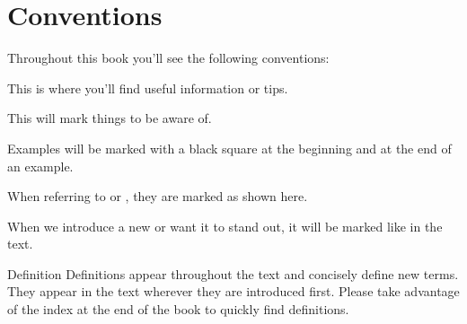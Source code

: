 % 

\section{Conventions}

Throughout this book you'll see the following conventions:

\begin{info}
This is where you'll find useful information or tips.
\end{info}

\begin{warning}
This will mark things to be aware of.
\end{warning}

\begin{example}
Examples will be marked with a black square at the beginning and at the end of an example.
\end{example}

When referring to  or , they are marked as shown here.

When we introduce a new  or want it to stand out, it will be marked like  in the text.  

\begin{definition}{Definition}
Definitions appear throughout the text and concisely define new terms.  They appear in the text wherever they are introduced first.  Please take advantage of the index at the end of the book to quickly find definitions.
\end{definition}
